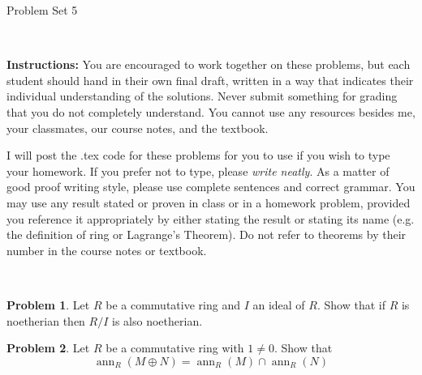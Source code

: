\documentclass[11pt]{article}
\title{}
\date{\vspace{-0.5in}}
\DeclareMathOperator{\ann}{ann}
\theoremstyle{definition}
\newtheorem{problem}{Problem}
\begin{document}
\thispagestyle{fancy}
\pagestyle{fancy}

\vspace{3em}

\begin{center}
	{\LARGE Problem Set 5}
\end{center}

\

\noindent
{\bf Instructions:}
You are encouraged to work together on these problems, but each student should hand in their own final draft, written in a way that indicates their individual understanding of the solutions. Never submit something for grading that you do not completely understand. You cannot use any resources besides me, your classmates, our course notes, and the textbook.


I will post the .tex code for these problems for you to use if you wish to type your homework. If you prefer not to type, please  {\em write neatly}. As a matter of good proof writing style, please use complete sentences and correct grammar. You may use any result  stated or proven in class or in a homework problem, provided you reference it appropriately by either stating the result or stating its name (e.g. the definition of ring or Lagrange's Theorem). Do not refer to theorems by their number in the course notes or textbook.


\






\begin{problem}
	Let $R$ be a commutative ring and $I$ an ideal of $R$. Show that if $R$ is noetherian then $R/I$ is also noetherian.
\end{problem}




\begin{problem}
Let $R$ be a commutative ring with $1 \neq 0$. Show that
$$\ann_R (M \oplus N) = \ann_R (M) \cap \ann_R (N)$$	
\end{problem}
\end{document}
